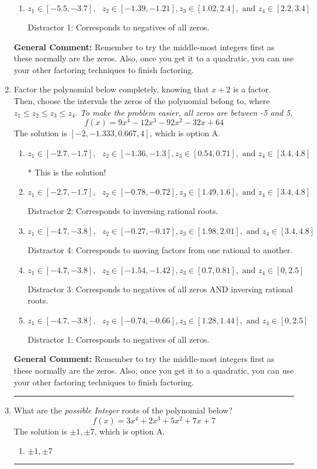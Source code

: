 \documentclass{extbook}[14pt]
\newcommand{\litem}[1]{\item #1

\rule{\textwidth}{0.4pt}}
\begin{document}
\begin{enumerate}
{\begin{enumerate}[label=\Alph*.]
 Distractor 3: Corresponds to negatives of all zeros AND inversing rational roots.
\item \( z_1 \in [-5.5, -3.7], \text{   }  z_2 \in [-1.39, -1.21], z_3 \in [1.02, 2.4], \text{   and   } z_4 \in [2.2, 3.4] \)

 Distractor 1: Corresponds to negatives of all zeros.
\end{enumerate}

\textbf{General Comment:} Remember to try the middle-most integers first as these normally are the zeros. Also, once you get it to a quadratic, you can use your other factoring techniques to finish factoring.
}
\litem{
Factor the polynomial below completely, knowing that $x + 2$ is a factor. Then, choose the intervals the zeros of the polynomial belong to, where $z_1 \leq z_2 \leq z_3 \leq z_4$. \textit{To make the problem easier, all zeros are between -5 and 5.}
\[ f(x) = 9x^{4} -12 x^{3} -92 x^{2} -32 x + 64 \]The solution is \( [-2, -1.333, 0.667, 4] \), which is option A.\begin{enumerate}[label=\Alph*.]
\item \( z_1 \in [-2.7, -1.7], \text{   }  z_2 \in [-1.36, -1.3], z_3 \in [0.54, 0.71], \text{   and   } z_4 \in [3.4, 4.8] \)

* This is the solution!
\item \( z_1 \in [-2.7, -1.7], \text{   }  z_2 \in [-0.78, -0.72], z_3 \in [1.49, 1.6], \text{   and   } z_4 \in [3.4, 4.8] \)

 Distractor 2: Corresponds to inversing rational roots.
\item \( z_1 \in [-4.7, -3.8], \text{   }  z_2 \in [-0.27, -0.17], z_3 \in [1.98, 2.01], \text{   and   } z_4 \in [3.4, 4.8] \)

 Distractor 4: Corresponds to moving factors from one rational to another.
\item \( z_1 \in [-4.7, -3.8], \text{   }  z_2 \in [-1.54, -1.42], z_3 \in [0.7, 0.81], \text{   and   } z_4 \in [0, 2.5] \)

 Distractor 3: Corresponds to negatives of all zeros AND inversing rational roots.
\item \( z_1 \in [-4.7, -3.8], \text{   }  z_2 \in [-0.74, -0.66], z_3 \in [1.28, 1.44], \text{   and   } z_4 \in [0, 2.5] \)

 Distractor 1: Corresponds to negatives of all zeros.
\end{enumerate}

\textbf{General Comment:} Remember to try the middle-most integers first as these normally are the zeros. Also, once you get it to a quadratic, you can use your other factoring techniques to finish factoring.
}
\litem{
What are the \textit{possible Integer} roots of the polynomial below?
\[ f(x) = 3x^{4} +2 x^{3} +5 x^{2} +7 x + 7 \]The solution is \( \pm 1,\pm 7 \), which is option A.\begin{enumerate}[label=\Alph*.]
\item \( \pm 1,\pm 7 \)


\end{enumerate}}
\end{enumerate}
\end{document}
